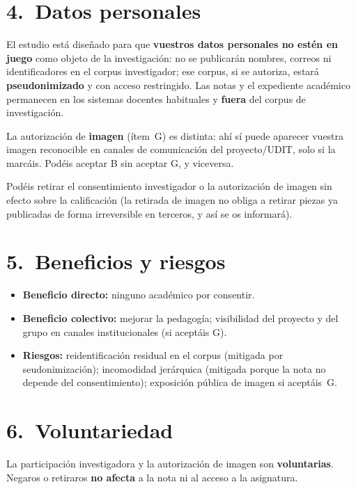 \documentclass[11pt,a4paper]{scrartcl}
\begin{document}
\section*{4.\ Datos personales}

El estudio está diseñado para que \textbf{vuestros datos personales no estén
en juego} como objeto de la investigación: no se publicarán nombres, correos
ni identificadores en el corpus investigador; ese corpus, si se autoriza, estará
\textbf{pseudonimizado} y con acceso restringido. Las notas y el expediente
académico permanecen en los sistemas docentes habituales y \textbf{fuera}
del corpus de investigación.

La autorización de \textbf{imagen} (ítem~G) es distinta: ahí sí puede aparecer
vuestra imagen reconocible en canales de comunicación del proyecto/UDIT, solo
si la marcáis. Podéis aceptar B sin aceptar G, y viceversa.

Podéis retirar el consentimiento investigador o la autorización de imagen sin
efecto sobre la calificación (la retirada de imagen no obliga a retirar
piezas ya publicadas de forma irreversible en terceros, y así se os informará).

\section*{5.\ Beneficios y riesgos}

\begin{itemize}
  \item \textbf{Beneficio directo:} ninguno académico por consentir.
  \item \textbf{Beneficio colectivo:} mejorar la pedagogía; visibilidad del
        proyecto y del grupo en canales institucionales (si aceptáis G).
  \item \textbf{Riesgos:} reidentificación residual en el corpus (mitigada por
        seudonimización); incomodidad jerárquica (mitigada porque la nota no
        depende del consentimiento); exposición pública de imagen si aceptáis~G.
\end{itemize}

\section*{6.\ Voluntariedad}

La participación investigadora y la autorización de imagen son
\textbf{voluntarias}. Negaros o retiraros \textbf{no afecta} a la nota
ni al acceso a la asignatura.
\end{document}
